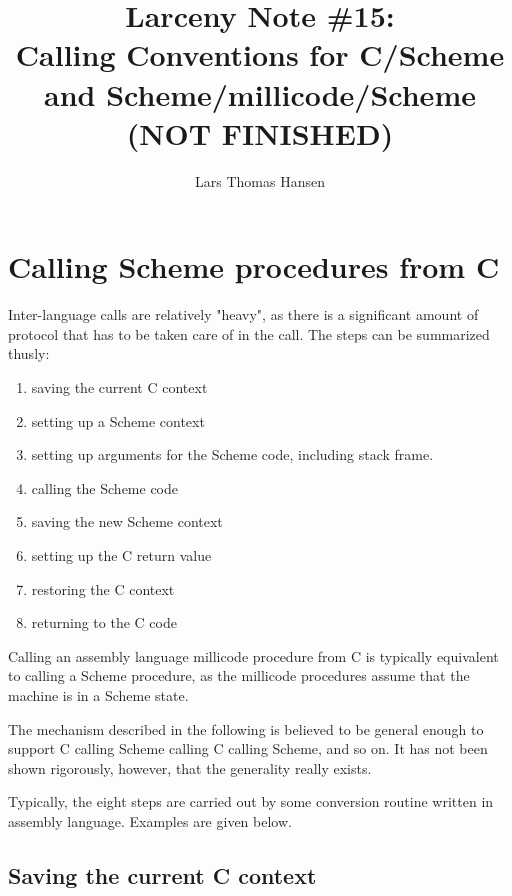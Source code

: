 


\title{Larceny Note \#15: \\
       Calling Conventions for C/Scheme and Scheme/millicode/Scheme \\
       {\tenrm (NOT FINISHED)}}
\author{Lars Thomas Hansen}


\maketitle

\section{Calling Scheme procedures from C}

Inter-language calls are relatively "heavy", as there is a significant
amount of protocol that has to be taken care of in the call. The steps can
be summarized thusly:

\begin{enumerate}
\item saving the current C context
\item setting up a Scheme context
\item setting up arguments for the Scheme code, including stack frame.
\item calling the Scheme code
\item saving the new Scheme context
\item setting up the C return value
\item restoring the C context
\item returning to the C code
\end{enumerate}

Calling an assembly language millicode procedure from C is typically
equivalent to calling a Scheme procedure, as the millicode procedures
assume that the machine is in a Scheme state.

The mechanism described in the following is believed to be general enough
to support C calling Scheme calling C calling Scheme, and so on. It has
not been shown rigorously, however, that the generality really exists.

Typically, the eight steps are carried out by some conversion routine
written in assembly language. Examples are given below.

\subsection{Saving the current C context}

